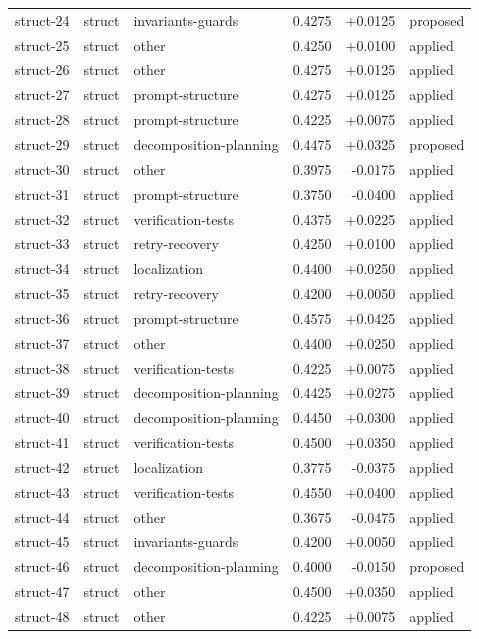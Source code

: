 \begin{center}
\begin{longtable}{llp{5.2cm}rrl}
struct-24 & struct & invariants-guards & 0.4275 & +0.0125 & proposed \\
struct-25 & struct & other & 0.4250 & +0.0100 & applied \\
struct-26 & struct & other & 0.4275 & +0.0125 & applied \\
struct-27 & struct & prompt-structure & 0.4275 & +0.0125 & applied \\
struct-28 & struct & prompt-structure & 0.4225 & +0.0075 & applied \\
struct-29 & struct & decomposition-planning & 0.4475 & +0.0325 & proposed \\
struct-30 & struct & other & 0.3975 & -0.0175 & applied \\
struct-31 & struct & prompt-structure & 0.3750 & -0.0400 & applied \\
struct-32 & struct & verification-tests & 0.4375 & +0.0225 & applied \\
struct-33 & struct & retry-recovery & 0.4250 & +0.0100 & applied \\
struct-34 & struct & localization & 0.4400 & +0.0250 & applied \\
struct-35 & struct & retry-recovery & 0.4200 & +0.0050 & applied \\
struct-36 & struct & prompt-structure & 0.4575 & +0.0425 & applied \\
struct-37 & struct & other & 0.4400 & +0.0250 & applied \\
struct-38 & struct & verification-tests & 0.4225 & +0.0075 & applied \\
struct-39 & struct & decomposition-planning & 0.4425 & +0.0275 & applied \\
struct-40 & struct & decomposition-planning & 0.4450 & +0.0300 & applied \\
struct-41 & struct & verification-tests & 0.4500 & +0.0350 & applied \\
struct-42 & struct & localization & 0.3775 & -0.0375 & applied \\
struct-43 & struct & verification-tests & 0.4550 & +0.0400 & applied \\
struct-44 & struct & other & 0.3675 & -0.0475 & applied \\
struct-45 & struct & invariants-guards & 0.4200 & +0.0050 & applied \\
struct-46 & struct & decomposition-planning & 0.4000 & -0.0150 & proposed \\
struct-47 & struct & other & 0.4500 & +0.0350 & applied \\
struct-48 & struct & other & 0.4225 & +0.0075 & applied \\

\end{longtable}
\end{center}
